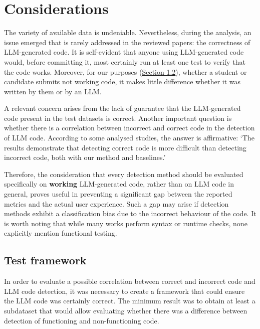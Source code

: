 \clearpage

\section{Considerations}
The variety of available data is undeniable. 
Nevertheless, during the analysis, an issue emerged that is rarely 
addressed in the reviewed papers: the correctness of 
LLM-generated code. It is self-evident that anyone using 
LLM-generated code would, before committing it, 
most certainly run at least one test to verify that the 
code works. Moreover, for our purposes 
(\hyperref[sec:Motivations Behind LLM-Generated Code Detection]{Section 1.2}), 
whether a student or candidate submits not working 
code, it makes little difference whether it was written by them or 
by an LLM. 

A relevant concern arises from the lack of guarantee 
that the LLM-generated code present in the test datasets is 
correct. Another important question is whether there is a 
correlation between incorrect and correct code in the detection of 
LLM code. According to some analysed studies, the answer is affirmative: 
‘The results demonstrate that detecting correct code is more difficult 
than detecting incorrect code, both with our method and 
baselines.’~\cite{ye2023uncovering}

Therefore, the consideration that every detection method 
should be evaluated specifically on \textbf{working} LLM-generated code, 
rather than on LLM code in general, proves useful in preventing a 
significant gap between the reported metrics and the actual user 
experience. Such a gap may arise if detection methods exhibit a 
classification bias due to the incorrect behaviour of the code. 
It is worth noting that while many works perform syntax or runtime 
checks, none explicitly mention functional testing.


\newpage
\subsection{Test framework}
\label{section:Test framework}
In order to evaluate a possible correlation between correct and incorrect 
code and LLM code detection, it was necessary to create a framework that 
could ensure the LLM code was certainly correct. The minimum result was 
to obtain at least a subdataset that would allow evaluating whether there was a 
difference between detection of functioning and non-functioning code.

